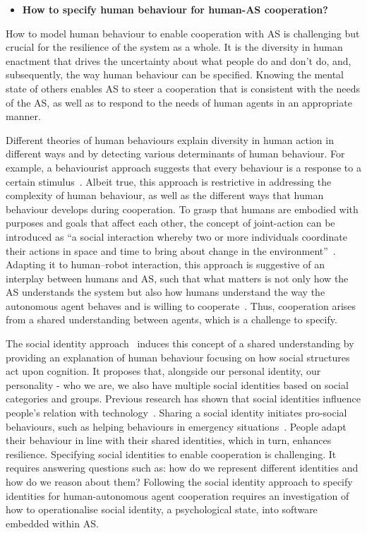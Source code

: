 \documentclass[sigconf,nonacm]{acmart}%
\begin{document}
	\begin{itemize}[leftmargin=0.5cm]
		\item \textbf{How to specify human behaviour for human-AS cooperation?}
	\end{itemize}
	How to model human behaviour to enable cooperation with AS is challenging but crucial for the resilience of the system as a whole. It is the diversity in human enactment that drives the uncertainty about what people do and don't do, and, subsequently, the way human behaviour can be specified. Knowing the mental state of others enables AS to steer a cooperation that is consistent with the needs of the AS, as well as to respond to the needs of human agents in an appropriate manner. 
	
	Different theories of human behaviours explain diversity in human action in different ways and by detecting various determinants of human behaviour. For example, a behaviourist approach suggests that every behaviour is a response to a certain stimulus~\cite{heimlich2008understanding}. Albeit true, this approach is restrictive in addressing the complexity of human behaviour, as well as the different ways that human behaviour develops during cooperation. To grasp that humans are embodied with purposes and goals that affect each other, the concept of joint-action can be introduced as ``a social interaction whereby two or more individuals coordinate their actions in space and time to bring about change in the environment''~\cite{sebanz2006joint}. Adapting it to human–robot interaction, this approach is suggestive of an interplay between humans and AS, such that what matters is not only how the AS understands the system but also how humans understand the way the autonomous agent behaves and is willing to cooperate~\cite{grigore:2013}. Thus, cooperation arises from a shared understanding between agents, which is a challenge to specify. 
	
	The social identity approach~\cite{spears2021social} induces this concept of a shared understanding by providing an explanation of human behaviour focusing on how social structures act upon cognition. It proposes that, alongside our personal identity, our personality - who we are, we also have multiple social identities based on social categories and groups. 
	Previous research has shown that social identities influence people's relation with technology~\cite{lee2001effect}. Sharing a social identity initiates pro-social behaviours, such as helping behaviours in emergency situations~\cite{drury2018role}. People adapt their behaviour in line with their shared identities, which in turn, enhances resilience. Specifying social identities to enable cooperation is challenging. It requires answering questions such as: how do we represent different identities and how do we reason about them? Following the social identity approach to specify identities for human-autonomous agent cooperation requires an investigation of how to operationalise social identity, a psychological state, into software embedded within AS.
	
\end{document}
